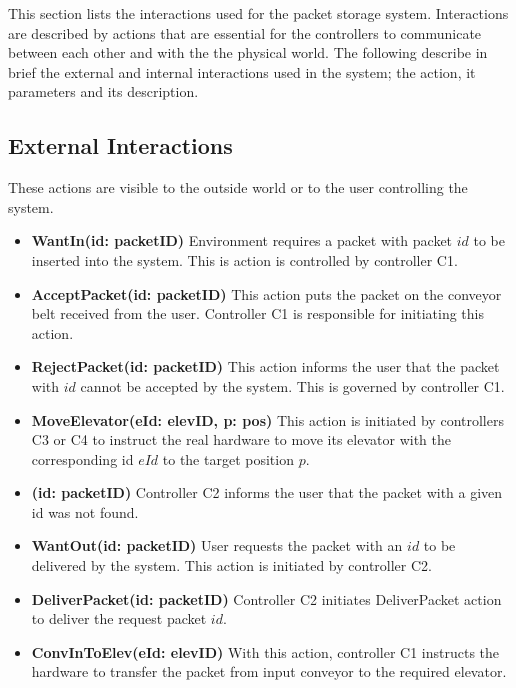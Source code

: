 \label{sec:ext_interactions}
This section lists the interactions used for the packet storage system. Interactions are described by actions that are essential for the controllers to communicate between each other and with the the physical world. The following describe in brief the external and internal interactions used in the system; the action, it parameters and its description.

\subsection*{External Interactions} These actions are visible to the outside world or to the user controlling the system.

\begin{itemize}
\item \textbf{WantIn(id: packetID)}
Environment requires a packet with packet $id$ to be inserted into the system. This is action is controlled by controller C1.

\item \textbf{AcceptPacket(id: packetID)}
This action puts the packet on the conveyor belt received from the user. Controller C1 is responsible for initiating this action.

\item \textbf{RejectPacket(id: packetID)}
This action informs the user that the packet with $id$ cannot be accepted by the system. This is governed by controller C1.

\item \textbf{MoveElevator(eId: elevID, p: pos)}
This action is initiated by controllers C3 or C4 to instruct the real hardware to move its elevator with the corresponding id $eId$ to the target position $p$.

\item \textbf{(id: packetID)}
Controller C2 informs the user that the packet with a given id was not found.

\item \textbf{WantOut(id: packetID)}
User requests the packet with an $id$ to be delivered by the system. This action is initiated by controller C2.

\item \textbf{DeliverPacket(id: packetID)}
Controller C2 initiates DeliverPacket action to deliver the request packet $id$.

\item \textbf{ConvInToElev(eId: elevID)}
With this action, controller C1 instructs the hardware to transfer the packet from input conveyor to the required elevator.


\end{itemize}

